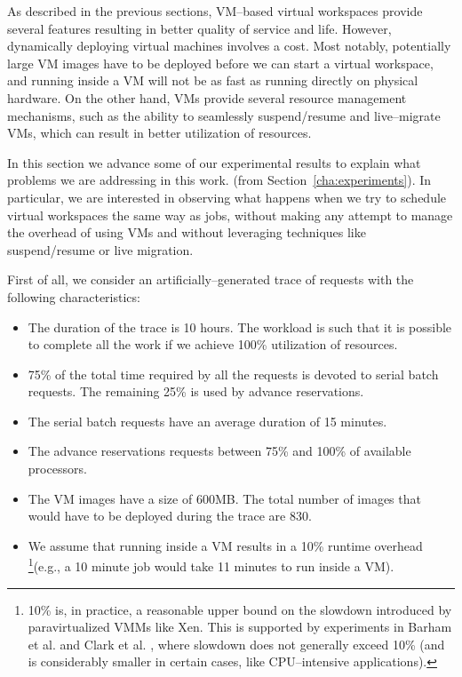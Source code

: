 As described in the previous sections, VM--based virtual workspaces provide several features resulting in better quality of service and life. However, dynamically deploying virtual machines involves a cost. Most notably, potentially large VM images have to be deployed before we can start a virtual workspace, and running inside a VM will not be as fast as running directly on physical hardware. On the other hand, VMs provide several resource management mechanisms, such as the ability to seamlessly suspend/resume and live--migrate VMs, which can result in better utilization of resources.

In this section we advance some of our experimental results to explain what problems we are addressing in this work. (from Section~\ref{cha:experiments}). In particular, we are interested in observing what happens when we try to schedule virtual workspaces the same way as jobs, without making any attempt to manage the overhead of using VMs and without leveraging techniques like suspend/resume or live migration.

First of all, we consider an artificially--generated trace of requests with the following characteristics:

\begin{itemize}
\item The duration of the trace is 10 hours. The workload is such that it is possible to complete all the work if we achieve 100\% utilization of resources.
\item 75\% of the total time required by all the requests is devoted to serial batch requests. The remaining 25\% is used by advance reservations.
\item The serial batch requests have an average duration of 15 minutes.
\item The advance reservations requests between 75\% and 100\% of available processors.
\item The VM images have a size of 600MB. The total number of images that would have to be deployed during the trace are 830.
\item We assume that running inside a VM results in a 10\% runtime overhead \footnote{10\% is, in practice, a reasonable upper bound on the slowdown introduced by paravirtualized VMMs like Xen. This is supported by experiments in Barham et al. \cite{xen} and Clark et al. \cite{xenrepeated}, where slowdown does not generally exceed 10\% (and is considerably smaller in certain cases, like CPU--intensive applications).}(e.g., a 10 minute job would take 11 minutes to run inside a VM). 
\end{itemize}

